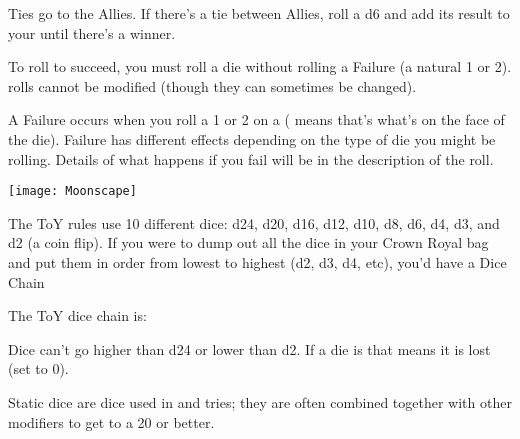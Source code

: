 {Ties go to the Allies.  If there's a tie between Allies, roll a d6 and add its result to your \RB until there's a winner.

\cbreak\bump

To roll to succeed, you must roll a die without rolling a Failure (a natural 1 or 2).  \RS rolls cannot be modified (though they can sometimes be changed).  

A Failure occurs when you roll a  1 or 2 on a \RS ( means that's what's on the face of the die). Failure has different effects depending on the type of die you might be rolling.  Details of what happens if you fail will be in the description of the roll.

\begin{center}
\texttt{[image: Moonscape]}
\end{center}


\newpage

The ToY rules use 10 different dice: d24, d20, d16, d12, d10, d8, d6, d4, d3, and d2 (a coin flip).   If you were to dump out all the dice in your Crown Royal bag and put them in order from lowest to highest (d2, d3, d4, etc), you'd have a Dice Chain

The ToY dice chain is:
~\\


Dice can't go higher than d24 or lower than d2.  If a die is   that means it is lost (set to 0).


Static dice are dice used in \RO and \RB tries; they are often combined together with other modifiers to get to a 20 or better.

\cbreak\bump


}
